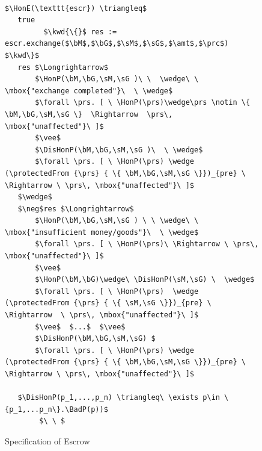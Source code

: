 \documentclass[acmsmall,review,anonymous,screen]{acmart}\settopmatter{printfolios=true,printacmref=false}
\begin{document}
 \begin{figure}[t]
\begin{lstlisting}[mathescape=true, language=Chainmail, frame=lines]

$\HonE(\texttt{escr}) \triangleq$     
   true
         $\kwd{\{}$ res := escr.exchange($\bM$,$\bG$,$\sM$,$\sG$,$\amt$,$\prc$) $\kwd\}$
   res $\Longrightarrow$
       $\HonP(\bM,\bG,\sM,\sG )\ \  \wedge\ \  \mbox{"exchange completed"}\  \ \wedge$
       $\forall \prs. [ \ \HonP(\prs)\wedge\prs \notin \{ \bM,\bG,\sM,\sG \}  \Rightarrow  \prs\, \mbox{"unaffected"}\ ]$           
       $\vee$
       $\DisHonP(\bM,\bG,\sM,\sG )\  \ \wedge$
       $\forall \prs. [ \ \HonP(\prs) \wedge  (\protectedFrom {\prs} { \{ \bM,\bG,\sM,\sG \}})_{pre} \ \Rightarrow \ \prs\, \mbox{"unaffected"}\ ]$
   $\wedge$
   $\neg$res $\Longrightarrow$
       $\HonP(\bM,\bG,\sM,\sG ) \ \ \wedge\ \  \mbox{"insufficient money/goods"}\  \ \wedge$
       $\forall \prs. [ \ \HonP(\prs)\ \Rightarrow \ \prs\, \mbox{"unaffected"}\ ]$    
       $\vee$
       $\HonP(\bM,\bG)\wedge\ \DisHonP(\sM,\sG) \  \wedge$
       $\forall \prs. [ \ \HonP(\prs)  \wedge   (\protectedFrom {\prs} { \{ \sM,\sG \}})_{pre} \  \Rightarrow  \ \prs\, \mbox{"unaffected"}\ ]$
       $\vee$  $...$  $\vee$
       $\DisHonP(\bM,\bG,\sM,\sG) $
       $\forall \prs. [ \ \HonP(\prs) \wedge   (\protectedFrom {\prs} { \{ \bM,\bG,\sM,\sG \}})_{pre} \ \Rightarrow \ \prs\, \mbox{"unaffected"}\ ]$
  
   $\DisHonP(p_1,...,p_n) \triangleq\ \exists p\in \{p_1,...p_n\}.\BadP(p))$
        $\ \ $
\end{lstlisting}
\caption{Specification of Escrow  }
\label{fig:EscrowSpec}
 \end{figure}
 
\end{document}
